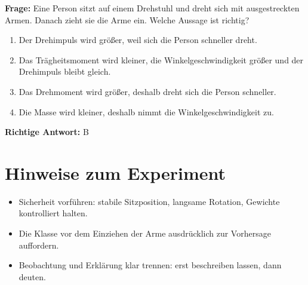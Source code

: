 \documentclass[12pt,a4paper]{article}
\begin{document}
\textbf{Frage:} Eine Person sitzt auf einem Drehstuhl und dreht sich mit ausgestreckten Armen. Danach zieht sie die Arme ein. Welche Aussage ist richtig?

\begin{enumerate}[label=\Alph*.]
    \item Der Drehimpuls wird größer, weil sich die Person schneller dreht.
    \item Das Trägheitsmoment wird kleiner, die Winkelgeschwindigkeit größer und der Drehimpuls bleibt gleich.
    \item Das Drehmoment wird größer, deshalb dreht sich die Person schneller.
    \item Die Masse wird kleiner, deshalb nimmt die Winkelgeschwindigkeit zu.
\end{enumerate}

\textbf{Richtige Antwort:} B

\section*{Hinweise zum Experiment}

\begin{itemize}[leftmargin=1.2cm]
    \item Sicherheit vorführen: stabile Sitzposition, langsame Rotation, Gewichte kontrolliert halten.
    \item Die Klasse vor dem Einziehen der Arme ausdrücklich zur Vorhersage auffordern.
    \item Beobachtung und Erklärung klar trennen: erst beschreiben lassen, dann deuten.
\end{itemize}
\end{document}
